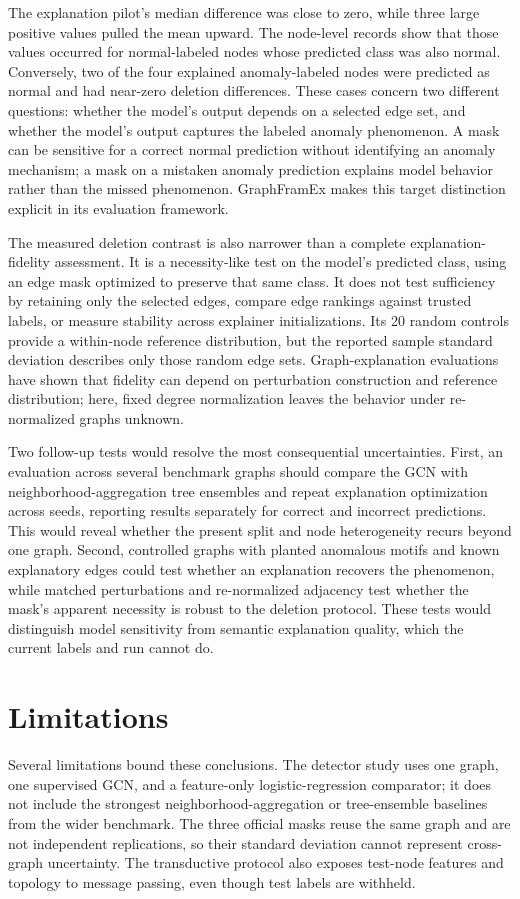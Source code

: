 \documentclass[11pt,a4paper]{article}
\begin{document}
The explanation pilot's median difference was close to zero, while three large positive values pulled the mean upward. The node-level records show that those values occurred for normal-labeled nodes whose predicted class was also normal. Conversely, two of the four explained anomaly-labeled nodes were predicted as normal and had near-zero deletion differences. These cases concern two different questions: whether the model's output depends on a selected edge set, and whether the model's output captures the labeled anomaly phenomenon. A mask can be sensitive for a correct normal prediction without identifying an anomaly mechanism; a mask on a mistaken anomaly prediction explains model behavior rather than the missed phenomenon. GraphFramEx makes this target distinction explicit in its evaluation framework\cite{amara2022graphframex}.

The measured deletion contrast is also narrower than a complete explanation-fidelity assessment. It is a necessity-like test on the model's predicted class, using an edge mask optimized to preserve that same class. It does not test sufficiency by retaining only the selected edges, compare edge rankings against trusted labels, or measure stability across explainer initializations. Its 20 random controls provide a within-node reference distribution, but the reported sample standard deviation describes only those random edge sets. Graph-explanation evaluations have shown that fidelity can depend on perturbation construction and reference distribution\cite{agarwal2022probing,zheng2024robust}; here, fixed degree normalization leaves the behavior under re-normalized graphs unknown.

Two follow-up tests would resolve the most consequential uncertainties. First, an evaluation across several benchmark graphs should compare the GCN with neighborhood-aggregation tree ensembles and repeat explanation optimization across seeds, reporting results separately for correct and incorrect predictions. This would reveal whether the present split and node heterogeneity recurs beyond one graph. Second, controlled graphs with planted anomalous motifs and known explanatory edges could test whether an explanation recovers the phenomenon, while matched perturbations and re-normalized adjacency test whether the mask's apparent necessity is robust to the deletion protocol. These tests would distinguish model sensitivity from semantic explanation quality, which the current labels and run cannot do.

\section{Limitations}
Several limitations bound these conclusions. The detector study uses one graph, one supervised GCN, and a feature-only logistic-regression comparator; it does not include the strongest neighborhood-aggregation or tree-ensemble baselines from the wider benchmark. The three official masks reuse the same graph and are not independent replications, so their standard deviation cannot represent cross-graph uncertainty. The transductive protocol also exposes test-node features and topology to message passing, even though test labels are withheld.
\end{document}
